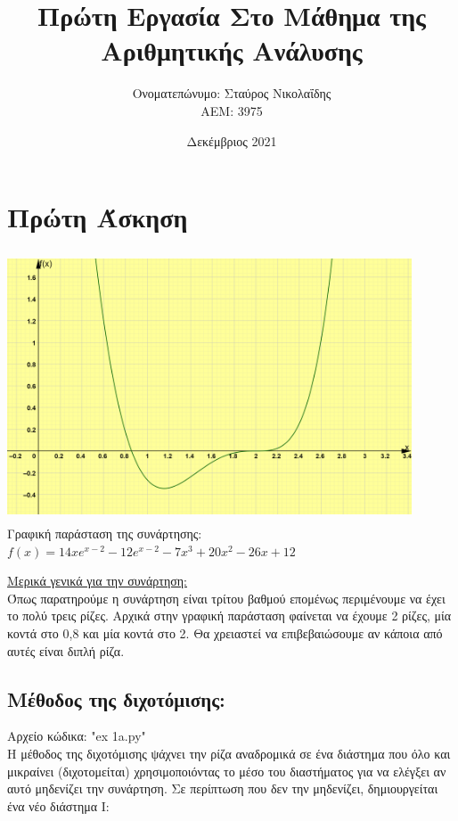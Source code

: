 \documentclass{article}
\title{Πρώτη Εργασία Στο Μάθημα της Αριθμητικής Ανάλυσης}
\author{Ονοματεπώνυμο: Σταύρος Νικολαΐδης  \\  ΑΕΜ: 3975}
\date{Δεκέμβριος 2021}
\begin{document}
\maketitle

\section{Πρώτη Άσκηση}

\includegraphics[width=12cm, height=8cm]{images/Figure_1.png} \\
Γραφική παράσταση της συνάρτησης: \( f(x) = 14xe^{x-2} - 12e^{x-2} - 7x^3 + 20x^2 - 26x + 12 \)

\vspace{5mm} 
\large{\underline{Μερικά γενικά για την συνάρτηση: }} \\
Όπως παρατηρούμε η συνάρτηση είναι τρίτου βαθμού επομένως περιμένουμε να έχει το πολύ τρεις ρίζες. Αρχικά στην γραφική παράσταση φαίνεται να έχουμε 2 ρίζες, μία κοντά στο 0,8 και μία κοντά στο 2. Θα χρειαστεί να επιβεβαιώσουμε αν κάποια από αυτές είναι διπλή ρίζα.

\vspace{3mm}
\subsection{Μέθοδος της διχοτόμισης: }

Αρχείο κώδικα: "ex 1a.py" \\

Η μέθοδος της διχοτόμισης ψάχνει την ρίζα αναδρομικά σε ένα διάστημα που όλο και μικραίνει (διχοτομείται) χρησιμοποιόντας το μέσο του διαστήματος για να ελέγξει αν αυτό μηδενίζει την συνάρτηση. Σε περίπτωση που δεν την μηδενίζει, δημιουργείται ένα νέο διάστημα Ι: \\
\end{document}
